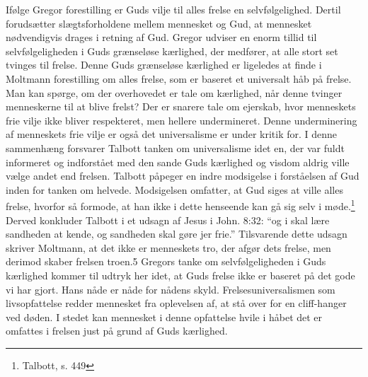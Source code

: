Ifølge Gregor forestilling er Guds vilje til alles frelse en selvfølgelighed. Dertil forudsætter slægtsforholdene mellem mennesket og Gud, at mennesket nødvendigvis drages i retning af Gud. Gregor udviser en enorm tillid til selvfølgeligheden i Guds grænseløse kærlighed, der medfører, at alle stort set tvinges til frelse. Denne Guds grænseløse kærlighed er ligeledes at finde i Moltmann forestilling om alles frelse, som er baseret et universalt håb på frelse. Man kan spørge, om der overhovedet er tale om kærlighed, når denne tvinger menneskerne til at blive frelst? Der er snarere tale om ejerskab, hvor menneskets frie vilje ikke bliver respekteret, men hellere undermineret. Denne underminering af menneskets frie vilje er også det universalisme er under kritik for. I denne sammenhæng forsvarer Talbott tanken om universalisme idet en, der var fuldt informeret og indforstået med den sande Guds kærlighed og visdom aldrig ville vælge andet end frelsen. Talbott påpeger en indre modsigelse i forståelsen af Gud inden for tanken om helvede. Modsigelsen omfatter, at Gud siges at ville alles frelse, hvorfor så formode, at han ikke i dette henseende kan gå sig selv i møde.\footnote{Talbott, s. 449} Derved  konkluder Talbott i et udsagn af Jesus i John. 8:32: “og i skal lære sandheden at kende, og sandheden skal gøre jer frie.” Tilsvarende dette udsagn skriver Moltmann, at det ikke er menneskets tro, der afgør dets frelse, men derimod skaber frelsen troen.5 Gregors tanke om selvfølgeligheden i Guds kærlighed kommer til udtryk her idet, at Guds frelse ikke er baseret på det gode vi har gjort. Hans nåde er nåde for nådens skyld. Frelsesuniversalismen som livsopfattelse redder mennesket fra oplevelsen af, at stå over for en cliff-hanger ved døden. I stedet kan mennesket i denne opfattelse hvile i håbet det er omfattes i frelsen just på grund af Guds kærlighed.

